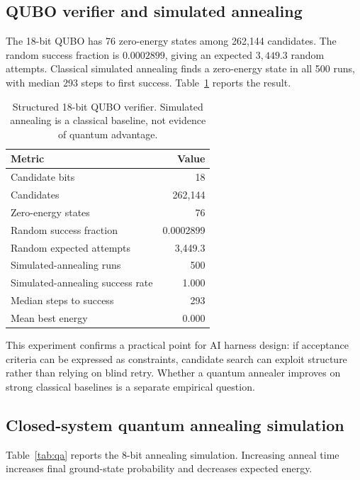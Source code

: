 \documentclass[11pt]{article}
\begin{document}
\subsection{QUBO verifier and simulated annealing}

The 18-bit QUBO has 76 zero-energy states among 262,144 candidates. The random success fraction is $0.0002899$, giving an expected $3{,}449.3$ random attempts. Classical simulated annealing finds a zero-energy state in all 500 runs, with median 293 steps to first success. Table~\ref{tab:qubo} reports the result.

\begin{table}[t]
\centering
\caption{Structured 18-bit QUBO verifier. Simulated annealing is a classical baseline, not evidence of quantum advantage.}
\label{tab:qubo}
\begin{tabular}{lr}
\toprule
Metric & Value \\
\midrule
Candidate bits & 18 \\
Candidates & 262,144 \\
Zero-energy states & 76 \\
Random success fraction & 0.0002899 \\
Random expected attempts & 3,449.3 \\
Simulated-annealing runs & 500 \\
Simulated-annealing success rate & 1.000 \\
Median steps to success & 293 \\
Mean best energy & 0.000 \\
\bottomrule
\end{tabular}
\end{table}

This experiment confirms a practical point for AI harness design: if acceptance criteria can be expressed as constraints, candidate search can exploit structure rather than relying on blind retry. Whether a quantum annealer improves on strong classical baselines is a separate empirical question.

\subsection{Closed-system quantum annealing simulation}

Table~\ref{tab:qa} reports the 8-bit annealing simulation. Increasing anneal time increases final ground-state probability and decreases expected energy.
\end{document}
